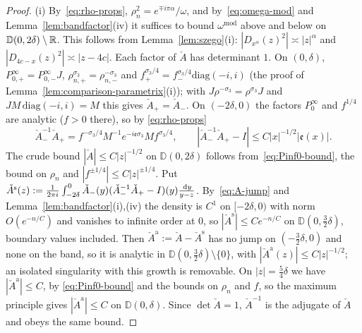 \begin{proof}
(i) By~\eqref{eq:rho-props}, $\rho_n^2=e^{\mp i\pi\alpha}/\omega$, and by~\eqref{eq:omega-mod} and
Lemma~\ref{lem:bandfactor}(iv) it suffices to bound $\omega^{\mathrm{mod}}$ above and below on $\mathbb D(0,2\delta)\setminus\mathbb{R}$.
This follows from Lemma~\ref{lem:szego}(i): $|D_{x^\alpha}(z)^2|\asymp|z|^\alpha$ and $|D_{4c-x}(z)^2|\asymp|z-4c|$. Each
factor of $\check A$ has determinant $1$. On $(0,\delta)$, $P^\infty_{0,+}=P^\infty_{0,-}J$,
$\rho_{n,+}^{\sigma_3}=\rho_{n,-}^{-\sigma_3}$ and $f_+^{\sigma_3/4}=f_-^{\sigma_3/4}\mathrm{diag}(-i,i)$ (the proof of
Lemma~\ref{lem:comparison-parametrix}(i)); with $J\rho^{-\sigma_3}=\rho^{\sigma_3}J$ and $JM\,\mathrm{diag}(-i,i)=M$ this
gives $\check A_+=\check A_-$. On $(-2\delta,0)$ the factors $P^\infty_0$ and $f^{1/4}$ are analytic ($f>0$ there), so by
\eqref{eq:rho-props}
\begin{equation}\label{eq:A-jump}
  \check A_-^{-1}\check A_+=f^{-\sigma_3/4}M^{-1}e^{-i\mathfrak e\sigma_3}Mf^{\sigma_3/4},\qquad
  |\check A_-^{-1}\check A_+-I|\le C|x|^{-1/2}|\mathfrak e(x)| .
\end{equation}
The crude bound $|\check A|\le C|z|^{-1/2}$ on $\mathbb D(0,2\delta)$ follows from~\eqref{eq:Pinf0-bound}, the bound on $\rho_n$ and
$|f^{\pm1/4}|\le C|z|^{\pm1/4}$. Put $\check A^{\mathrm s}(z):=\frac1{2\pi i}\int_{-2\delta}^0\check A_-(y)(\check A_-^{-1}\check A_+-I)(y)
\frac{\,\mathrm{d} y}{y-z}$. By~\eqref{eq:A-jump} and Lemma~\ref{lem:bandfactor}(i),(iv) the density is $C^1$ on $[-2\delta,0)$ with
norm $O(e^{-n/C})$ and vanishes to infinite order at $0$, so $|\check A^{\mathrm s}|\le Ce^{-n/C}$ on $\mathbb D(0,\frac32\delta)$,
boundary values included. Then $\check A^{\mathrm a}:=\check A-\check A^{\mathrm s}$ has no jump on $(-\frac32\delta,0)$
and none on the band, so it is analytic in $\mathbb D(0,\frac32\delta)\setminus\{0\}$, with $|\check A^{\mathrm a}(z)|\le C|z|^{-1/2}$;
an isolated singularity with this growth is removable. On $|z|=\frac54\delta$ we have $|\check A^{\mathrm a}|\le C$, by
\eqref{eq:Pinf0-bound} and the bounds on $\rho_n$ and $f$, so the maximum principle gives $|\check A^{\mathrm a}|\le C$ on
$\mathbb D(0,\delta)$. Since $\det\check A=1$, $\check A^{-1}$ is the adjugate of $\check A$ and obeys the same bound.


\end{proof}
